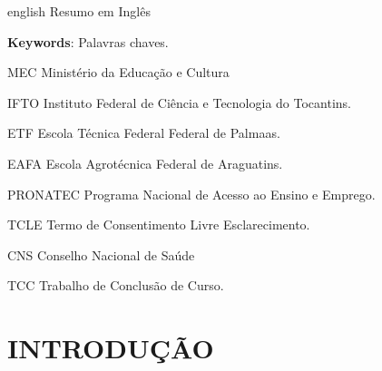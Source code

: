 \documentclass[
	12pt,				%
	a4paper,			%
    openany,
    oneside,
	english,			%
	french,				%
	spanish,			%
	brazil,				%
	]{abntex2}
\begin{document}

\begin{resumo}[ABSTRACT]
 \begin{otherlanguage*}{english}
Resumo em Inglês

  \noindent
  \textbf{Keywords}: Palavras chaves.
 \end{otherlanguage*}
\end{resumo}

\clearpage
\listoffigures
\cleardoublepage

\listoftables
\cleardoublepage

\begin{siglas}
  \item[MEC] Ministério da Educação e Cultura
  \item[IFTO] Instituto Federal de Ciência e Tecnologia do Tocantins.
  \item[ETF] Escola Técnica Federal Federal de Palmaas.
  \item[EAFA] Escola Agrotécnica Federal de Araguatins.
  \item[PRONATEC] Programa Nacional de Acesso ao Ensino e Emprego.
  \item[TCLE] Termo de Consentimento Livre Esclarecimento.
  \item[CNS] Conselho Nacional de Saúde
  \item[TCC] Trabalho de Conclusão de Curso.
\end{siglas}


\tableofcontents*
\cleardoublepage


\textual

\chapter{INTRODUÇÃO}
\end{document}
